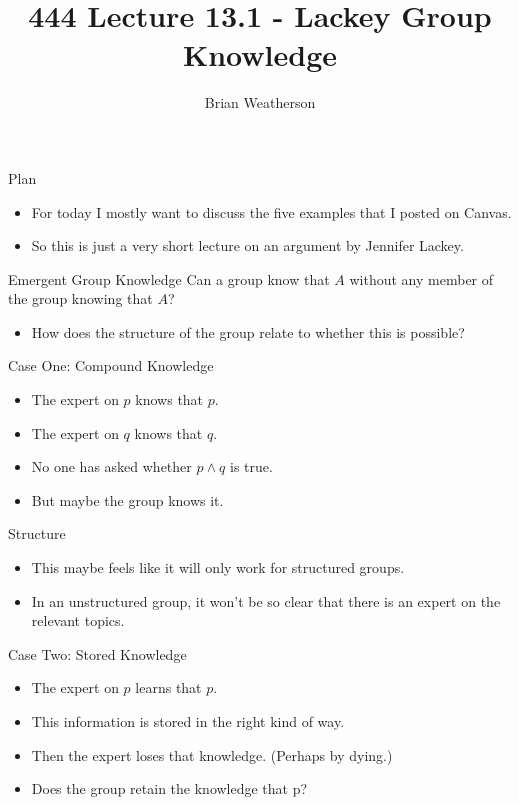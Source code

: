 \documentclass[
  ignorenonframetext,
]{beamer}
\title{444 Lecture 13.1 - Lackey Group Knowledge}
\author{Brian Weatherson}
\date{}
\providecommand{\tightlist}{%
  \setlength{\itemsep}{0pt}\setlength{\parskip}{0pt}}
\begin{document}
\frame{\titlepage}

\begin{frame}{Plan}
\protect\hypertarget{plan}{}
\begin{itemize}
\tightlist
\item
  For today I mostly want to discuss the five examples that I posted on
  Canvas.
\item
  So this is just a very short lecture on an argument by Jennifer
  Lackey.
\end{itemize}
\end{frame}

\begin{frame}{Emergent Group Knowledge}
\protect\hypertarget{emergent-group-knowledge}{}
Can a group know that \(A\) without any member of the group knowing that
\(A\)? \pause

\begin{itemize}
\tightlist
\item
  How does the structure of the group relate to whether this is
  possible?
\end{itemize}
\end{frame}

\begin{frame}{Case One: Compound Knowledge}
\protect\hypertarget{case-one-compound-knowledge}{}
\begin{itemize}
\tightlist
\item
  The expert on \(p\) knows that \(p\).
\item
  The expert on \(q\) knows that \(q\).
\item
  No one has asked whether \(p \wedge q\) is true.
\item
  But maybe the group knows it.
\end{itemize}
\end{frame}

\begin{frame}{Structure}
\protect\hypertarget{structure}{}
\begin{itemize}
\tightlist
\item
  This maybe feels like it will only work for structured groups.
\item
  In an unstructured group, it won't be so clear that there is an expert
  on the relevant topics.
\end{itemize}
\end{frame}

\begin{frame}{Case Two: Stored Knowledge}
\protect\hypertarget{case-two-stored-knowledge}{}
\begin{itemize}
\tightlist
\item
  The expert on \(p\) learns that \(p\).
\item
  This information is stored in the right kind of way.
\item
  Then the expert loses that knowledge. (Perhaps by dying.)
\item
  Does the group retain the knowledge that p?
\end{itemize}
\end{frame}
\end{document}
